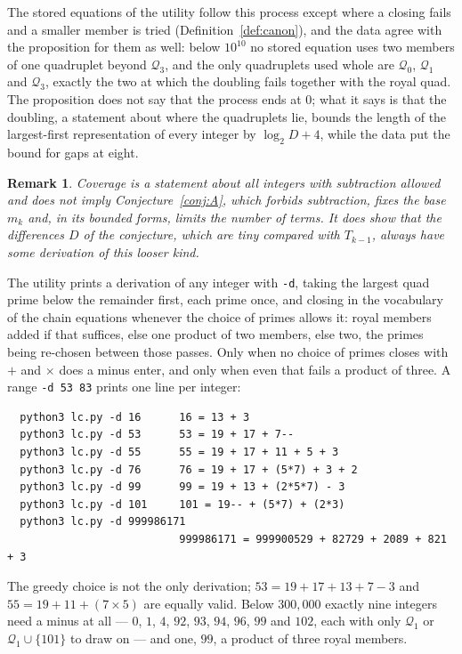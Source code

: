 \documentclass[11pt,a4paper]{article}
\newtheorem{remark}{Remark}
\newcommand{\Q}{\mathcal{Q}}
\newcommand{\code}[1]{\texttt{#1}}
\begin{document}
The stored equations of the utility follow this process except where a
closing fails and a smaller member is tried (Definition~\ref{def:canon}),
and the data agree with the proposition for them as well: below $10^{10}$
no stored equation uses two members of one quadruplet beyond $\Q_3$, and
the only quadruplets used whole are $\Q_0$, $\Q_1$ and $\Q_3$, exactly the
two at which the doubling fails together with the royal quad. The
proposition does not say that the process ends at $0$; what it says is
that the doubling, a statement about where the quadruplets lie, bounds the
length of the largest-first representation of every integer by
$\log_2D+4$, while the data put the bound for gaps at eight.

\begin{remark}
Coverage is a statement about \emph{all} integers with subtraction
allowed and does not imply Conjecture~\ref{conj:A}, which forbids
subtraction, fixes the base $m_k$ and, in its bounded forms, limits the
number of terms. It does show that the differences $D$ of the conjecture,
which are tiny compared with $T_{k-1}$, always have \emph{some} derivation
of this looser kind.
\end{remark}

The utility prints a derivation of any integer with \code{-d}, taking the
largest quad prime below the remainder first, each prime once, and closing
in the vocabulary of the chain equations whenever the choice of primes
allows it: royal members added if that suffices, else one product of two
members, else two, the primes being re-chosen between those passes. Only
when no choice of primes closes with $+$ and $\times$ does a minus enter,
and only when even that fails a product of three. A range \code{-d 53 83}
prints one line per integer:
\begin{small}\begin{verbatim}
  python3 lc.py -d 16      16 = 13 + 3
  python3 lc.py -d 53      53 = 19 + 17 + 7--
  python3 lc.py -d 55      55 = 19 + 17 + 11 + 5 + 3
  python3 lc.py -d 76      76 = 19 + 17 + (5*7) + 3 + 2
  python3 lc.py -d 99      99 = 19 + 13 + (2*5*7) - 3
  python3 lc.py -d 101     101 = 19-- + (5*7) + (2*3)
  python3 lc.py -d 999986171
                           999986171 = 999900529 + 82729 + 2089 + 821 + 3
\end{verbatim}\end{small}
The greedy choice is not the only derivation; $53=19+17+13+7-3$ and
$55=19+11+(7\times5)$ are equally valid. Below $300{,}000$ exactly nine
integers need a minus at all --- $0$, $1$, $4$, $92$, $93$, $94$, $96$,
$99$ and $102$, each with only $\Q_1$ or $\Q_1\cup\{101\}$ to draw on ---
and one, $99$, a product of three royal members.
\end{document}
